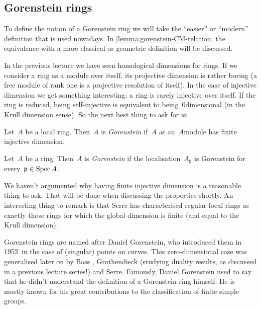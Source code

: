 \documentclass[10pt,a4paper]{article}
\begin{document}
\subsection{Gorenstein rings}
To define the notion of a Gorenstein ring we will take the ``easier'' or ``modern'' definition that is used nowadays. In \cref{lemma:gorenstein-CM-relation} the equivalence with a more classical or geometric definition will be discussed.

In the previous lecture we have seen homological dimensions for rings. If we consider a ring as a module over itself, its projective dimension is rather boring (a free module of rank one is a projective resolution of itself). In the case of injective dimension we get something interesting: a ring is rarely injective over itself. If the ring is reduced, being self-injective is equivalent to being~$0$\dash dimensional (in the Krull dimension sense). So the next best thing to ask for is:
\begin{definition}
  Let~$A$ be a local ring. Then~$A$ is \emph{Gorenstein} if~$A$ as an~$A$\dash module has finite injective dimension.
  
  Let~$A$ be a ring. Then~$A$ is \emph{Gorenstein} if the localisation~$A_{\mathfrak{p}}$ is Gorenstein for every~$\mathfrak{p}\in\operatorname{Spec} A$.
\end{definition}

We haven't argumented why having finite injective dimension is a reasonable thing to ask. That will be done when discussing the properties shortly. An interesting thing to remark is that Serre has characterised regular local rings as exactly those rings for which the global dimension is finite (and equal to the Krull dimension).

\begin{remark}
  Gorenstein rings are named after Daniel Gorenstein, who introduced them in 1952\ in the case of (singular) points on curves. This zero-dimensional case was generalised later on by Bass \cite{bass-ubiquity-gorenstein-rings}, Grothendieck \cite{grothendieck-theoremes-de-dualite} (studying duality results, as discussed in a previous lecture series!) and Serre. Famously, Daniel Gorenstein used to say that he didn't understand the definition of a Gorenstein ring himself. He is mostly known for his great contributions to the classification of finite simple groups.
\end{remark}
\end{document}
